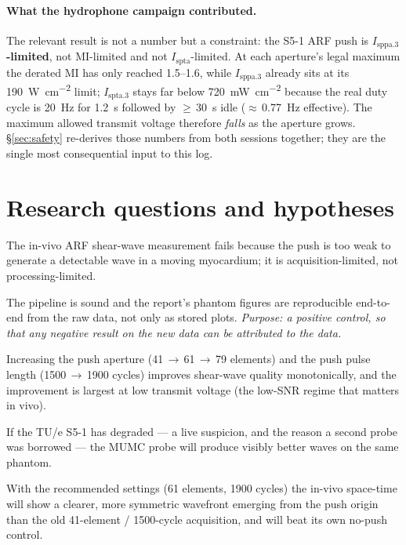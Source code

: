 \documentclass[11pt,a4paper]{article}
\begin{document}
\paragraph{What the hydrophone campaign contributed.} The relevant result is not a number but a
constraint: the S5-1 ARF push is \textbf{$I_\mathrm{sppa.3}$-limited}, not MI-limited and not
$I_\mathrm{spta}$-limited. At each aperture's legal maximum the derated MI has only reached
1.5--1.6, while $I_\mathrm{sppa.3}$ already sits at its \SI{190}{\watt\per\square\centi\metre}
limit; $I_\mathrm{spta.3}$ stays far below \SI{720}{\milli\watt\per\square\centi\metre} because the
real duty cycle is \SI{20}{\hertz} for \SI{1.2}{\second} followed by $\geq$\,\SI{30}{\second} idle
($\approx$\,\SI{0.77}{\hertz} effective). The maximum allowed transmit voltage therefore \emph{falls}
as the aperture grows. \S\ref{sec:safety} re-derives those numbers from both sessions together;
they are the single most consequential input to this log.

\section{Research questions and hypotheses}\label{sec:questions}
\begin{description}[leftmargin=1.4em,style=nextline]
  \item[H0 (the standing hypothesis).] The in-vivo ARF shear-wave measurement fails because the push
  is too weak to generate a detectable wave in a moving myocardium; it is acquisition-limited, not
  processing-limited.
  \item[H1 (Q1).] The pipeline is sound and the report's phantom figures are reproducible end-to-end
  from the raw data, not only as stored plots. \emph{Purpose: a positive control, so that any negative
  result on the new data can be attributed to the data.}
  \item[H2 (Q2).] Increasing the push aperture (41\,$\rightarrow$\,61\,$\rightarrow$\,79 elements) and
  the push pulse length (1500\,$\rightarrow$\,1900 cycles) improves shear-wave quality monotonically,
  and the improvement is largest at low transmit voltage (the low-SNR regime that matters in vivo).
  \item[H3 (Q3).] If the TU/e S5-1 has degraded --- a live suspicion, and the reason a second probe was
  borrowed --- the MUMC probe will produce visibly better waves on the same phantom.
  \item[H4 (Q4).] With the recommended settings (61 elements, 1900 cycles) the in-vivo space-time will
  show a clearer, more symmetric wavefront emerging from the push origin than the old
  41-element / 1500-cycle acquisition, and will beat its own no-push control.
\end{description}
\end{document}

